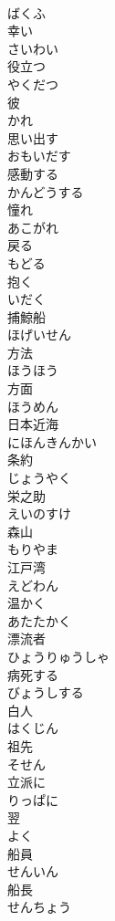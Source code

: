 \documentclass[8pt]{extreport}
\begin{document}
\begin{CJK}{UTF8}{min}
\\	ばくふ
\\	幸い	
\\	さいわい
\\	役立つ	
\\	やくだつ
\\	彼	
\\	かれ
\\	思い出す	
\\	おもいだす
\\	感動する	
\\	かんどうする
\\	憧れ	
\\	あこがれ
\\	戻る	
\\	もどる
\\	抱く	
\\	いだく
\\	捕鯨船	
\\	ほげいせん
\\	方法	
\\	ほうほう
\\	方面	
\\	ほうめん
\\	日本近海	
\\	にほんきんかい
\\	条約	
\\	じょうやく
\\	栄之助	
\\	えいのすけ
\\	森山	
\\	もりやま
\\	江戸湾	
\\	えどわん
\\	温かく	
\\	あたたかく
\\	漂流者	
\\	ひょうりゅうしゃ
\\	病死する	
\\	びょうしする
\\	白人	
\\	はくじん
\\	祖先	
\\	そせん
\\	立派に	
\\	りっぱに
\\	翌	
\\	よく
\\	船員	
\\	せんいん
\\	船長	
\\	せんちょう

\end{CJK}
\end{document}
